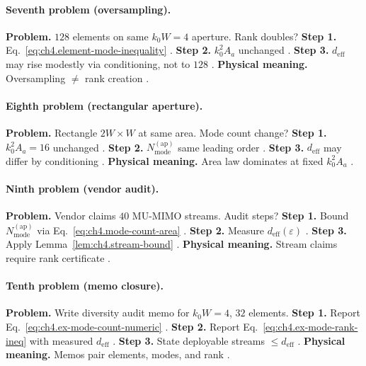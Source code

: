 \paragraph{Seventh problem (oversampling).}
\textbf{Problem.} \(128\) elements on same \(k_{0}W=4\) aperture. Rank doubles?
\textbf{Step 1.} Eq.~\eqref{eq:ch4.element-mode-inequality} \cite{collin2001,harrington2001,devaney2004}.
\textbf{Step 2.} \(k_{0}^{2}A_{a}\) unchanged \cite{jackson1999,hansen1988,stratton1941}.
\textbf{Step 3.} \(d_{\mathrm{eff}}\) may rise modestly via conditioning, not to \(128\) \cite{harrington2001,devaney2004}.
\textbf{Physical meaning.} Oversampling \(\neq\) rank creation \cite{stratton1941,collin2001}.

\paragraph{Eighth problem (rectangular aperture).}
\textbf{Problem.} Rectangle \(2W\times W\) at same area. Mode count change?
\textbf{Step 1.} \(k_{0}^{2}A_{a}=16\) unchanged \cite{jackson1999,hansen1988,harrington2001}.
\textbf{Step 2.} \(N_{\mathrm{mode}}^{\mathrm{(ap)}}\) same leading order \cite{collin2001,stratton1941,devaney2004}.
\textbf{Step 3.} \(d_{\mathrm{eff}}\) may differ by conditioning \cite{harrington2001,jackson1999}.
\textbf{Physical meaning.} Area law dominates at fixed \(k_{0}^{2}A_{a}\) \cite{hansen1988,stratton1941}.

\paragraph{Ninth problem (vendor audit).}
\textbf{Problem.} Vendor claims \(40\) MU-MIMO streams. Audit steps?
\textbf{Step 1.} Bound \(N_{\mathrm{mode}}^{\mathrm{(ap)}}\) via Eq.~\eqref{eq:ch4.mode-count-area} \cite{jackson1999,hansen1988,harrington2001}.
\textbf{Step 2.} Measure \(d_{\mathrm{eff}}(\varepsilon)\) \cite{devaney2004,stratton1941,collin2001}.
\textbf{Step 3.} Apply Lemma~\ref{lem:ch4.stream-bound} \cite{harrington2001,jackson1999}.
\textbf{Physical meaning.} Stream claims require rank certificate \cite{stratton1941,hansen1988}.

\paragraph{Tenth problem (memo closure).}
\textbf{Problem.} Write diversity audit memo for \(k_{0}W=4\), \(32\) elements.
\textbf{Step 1.} Report Eq.~\eqref{eq:ch4.ex-mode-count-numeric} \cite{harrington2001,collin2001,jackson1999}.
\textbf{Step 2.} Report Eq.~\eqref{eq:ch4.ex-mode-rank-ineq} with measured \(d_{\mathrm{eff}}\) \cite{hansen1988,devaney2004,stratton1941}.
\textbf{Step 3.} State deployable streams \(\le d_{\mathrm{eff}}\) \cite{harrington2001,jackson1999}.
\textbf{Physical meaning.} Memos pair elements, modes, and rank \cite{stratton1941,collin2001}.

